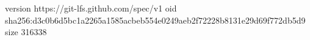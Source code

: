 version https://git-lfs.github.com/spec/v1
oid sha256:d3c0b6d5bc1a2265a1585acbeb554e0249aeb2f72228b8131e29d69f772db5d9
size 316338
